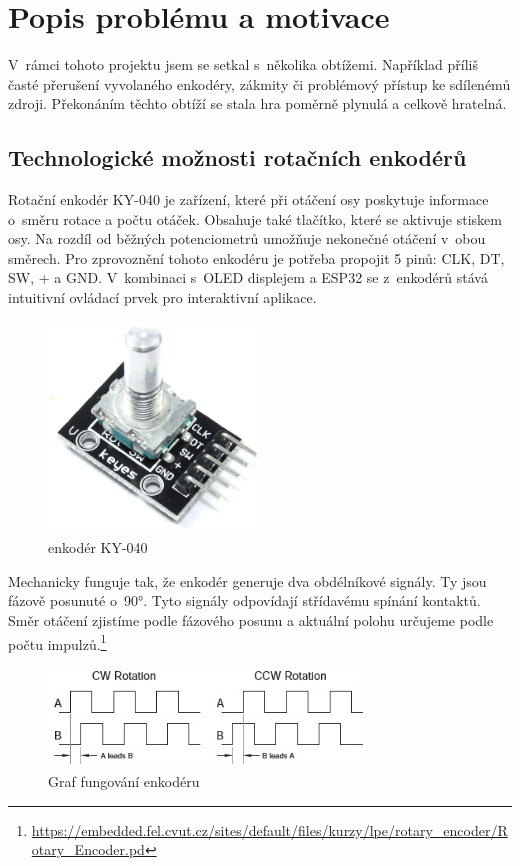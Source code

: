 \documentclass[a4paper,11pt]{article}
\begin{document}
\section{Popis problému a motivace}
V~rámci tohoto projektu jsem se setkal s~několika obtížemi.
Například příliš časté přerušení vyvolaného enkodéry, zákmity či problémový přístup ke sdílenémů zdroji. 
Překonáním těchto obtíží se stala hra poměrně plynulá a celkově hratelná.

\subsection{Technologické možnosti rotačních enkodérů} 
Rotační enkodér KY-040 je zařízení, které při otáčení osy poskytuje informace o~směru rotace a počtu otáček. 
Obsahuje také tlačítko, které se aktivuje stiskem osy. 
Na rozdíl od běžných potenciometrů umožňuje nekonečné otáčení v~obou směrech.
Pro zprovoznění tohoto enkodéru je potřeba propojit 5 pinů: CLK, DT, SW, + a GND.
V~kombinaci s~OLED displejem a ESP32 se z~enkodérů stává intuitivní ovládací prvek pro interaktivní aplikace.

\begin{figure}[H]
    \centering
    \includegraphics[width=0.5\textwidth]{obrazky-figures/enkoder.jpeg}
    \caption{enkodér KY-040}
\end{figure}

Mechanicky funguje tak, že enkodér generuje dva obdélníkové signály. 
Ty jsou fázově posunuté o~90°. 
Tyto signály odpovídají střídavému spínání kontaktů. 
Směr otáčení zjistíme podle fázového posunu a aktuální polohu určujeme podle počtu impulzů.\footnote{\url{https://embedded.fel.cvut.cz/sites/default/files/kurzy/lpe/rotary_encoder/Rotary_Encoder.pd}}

\begin{figure}[H]
    \centering
    \includegraphics[width=0.75\textwidth]{obrazky-figures/graf_enkoder.jpg}
    \caption[Caption for LOF]{Graf fungování enkodéru\footnotemark}
\end{figure}
\end{document}
